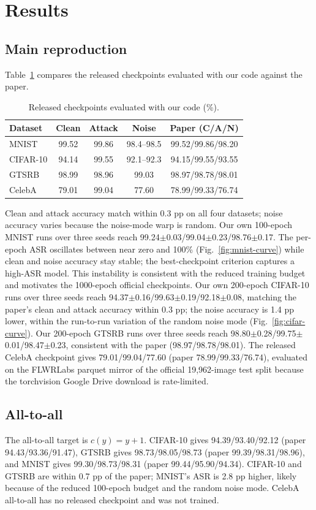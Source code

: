 \documentclass[conference]{IEEEtran}
\begin{document}
\section{Results}
\subsection{Main reproduction}
Table~\ref{tab:main} compares the released checkpoints evaluated with our code
against the paper.

\begin{table}[t]
\centering
\caption{Released checkpoints evaluated with our code (\%).}
\label{tab:main}
\begin{tabular}{lcccc}
\toprule
Dataset & Clean & Attack & Noise & Paper (C/A/N) \\
\midrule
MNIST & 99.52 & 99.86 & 98.4--98.5 & 99.52/99.86/98.20 \\
CIFAR-10 & 94.14 & 99.55 & 92.1--92.3 & 94.15/99.55/93.55 \\
GTSRB & 98.99 & 98.96 & 99.03 & 98.97/98.78/98.01 \\
CelebA & 79.01 & 99.04 & 77.60 & 78.99/99.33/76.74 \\
\bottomrule
\end{tabular}
\end{table}

Clean and attack accuracy match within 0.3 pp on all four datasets; noise
accuracy varies because the noise-mode warp is random. Our own 100-epoch MNIST
runs over three seeds reach 99.24$\pm$0.03/99.04$\pm$0.23/98.76$\pm$0.17. The
per-epoch ASR oscillates between near zero and 100\%
(Fig.~\ref{fig:mnist-curve}) while clean and noise accuracy stay stable; the
best-checkpoint criterion captures a high-ASR model. This instability is
consistent with the reduced training budget and motivates the 1000-epoch
official checkpoints. Our own 200-epoch CIFAR-10 runs over three seeds reach
94.37$\pm$0.16/99.63$\pm$0.19/92.18$\pm$0.08, matching the paper's clean and
attack accuracy within 0.3 pp; the noise accuracy is 1.4 pp lower, within the
run-to-run variation of the random noise mode (Fig.~\ref{fig:cifar-curve}).
Our 200-epoch GTSRB runs over three seeds reach
98.80$\pm$0.28/99.75$\pm$0.01/98.47$\pm$0.23, consistent with the paper
(98.97/98.78/98.01). The released CelebA checkpoint gives
79.01/99.04/77.60 (paper 78.99/99.33/76.74), evaluated on the FLWRLabs parquet
mirror of the official 19,962-image test split because the torchvision Google
Drive download is rate-limited.

\subsection{All-to-all}
The all-to-all target is $c(y)=y+1$. CIFAR-10 gives 94.39/93.40/92.12 (paper
94.43/93.36/91.47), GTSRB gives 98.73/98.05/98.73 (paper
99.39/98.31/98.96), and MNIST gives 99.30/98.73/98.31 (paper
99.44/95.90/94.34). CIFAR-10 and GTSRB are within 0.7 pp of the paper;
MNIST's ASR is 2.8 pp higher, likely because of the reduced 100-epoch budget
and the random noise mode. CelebA all-to-all has no released checkpoint and
was not trained.
\end{document}
